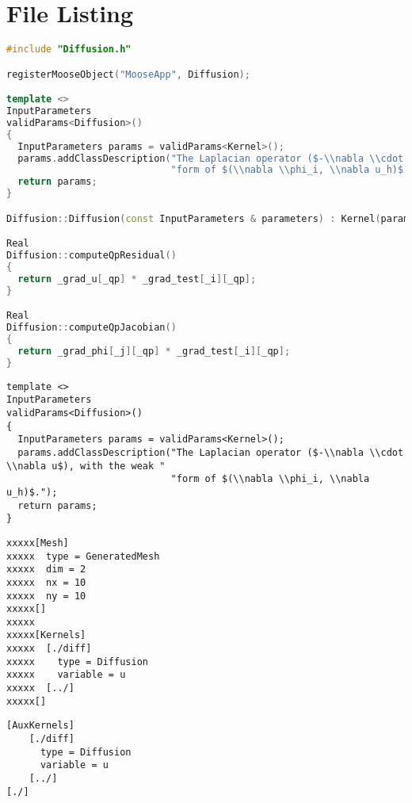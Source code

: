 \section{\label{file-listing}File Listing}
\begin{lstlisting}[language=C++,label=diffusion-c,caption=\mbox{}]
#include "Diffusion.h"

registerMooseObject("MooseApp", Diffusion);

template <>
InputParameters
validParams<Diffusion>()
{
  InputParameters params = validParams<Kernel>();
  params.addClassDescription("The Laplacian operator ($-\\nabla \\cdot \\nabla u$), with the weak "
                             "form of $(\\nabla \\phi_i, \\nabla u_h)$.");
  return params;
}

Diffusion::Diffusion(const InputParameters & parameters) : Kernel(parameters) {}

Real
Diffusion::computeQpResidual()
{
  return _grad_u[_qp] * _grad_test[_i][_qp];
}

Real
Diffusion::computeQpJacobian()
{
  return _grad_phi[_j][_qp] * _grad_test[_i][_qp];
}
\end{lstlisting}

\begin{verbatim}
template <>
InputParameters
validParams<Diffusion>()
{
  InputParameters params = validParams<Kernel>();
  params.addClassDescription("The Laplacian operator ($-\\nabla \\cdot \\nabla u$), with the weak "
                             "form of $(\\nabla \\phi_i, \\nabla u_h)$.");
  return params;
}
\end{verbatim}

\begin{verbatim}
xxxxx[Mesh]
xxxxx  type = GeneratedMesh
xxxxx  dim = 2
xxxxx  nx = 10
xxxxx  ny = 10
xxxxx[]
xxxxx
xxxxx[Kernels]
xxxxx  [./diff]
xxxxx    type = Diffusion
xxxxx    variable = u
xxxxx  [../]
xxxxx[]
\end{verbatim}

\begin{verbatim}
[AuxKernels]
    [./diff]
      type = Diffusion
      variable = u
    [../]
[./]
\end{verbatim}
